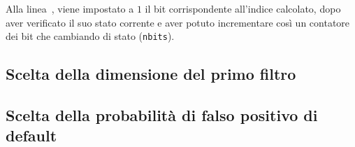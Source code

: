 Alla linea~\label{line:togglebit}, viene impostato a $1$ il bit corrispondente all'indice calcolato,
dopo aver verificato il suo stato corrente e aver potuto incrementare così un contatore dei bit che
cambiando di stato (\verb|nbits|).

\subsection{Scelta della dimensione del primo filtro}
\label{sec:patch:basesize}


\subsection{Scelta della probabilità di falso positivo di default}
\label{sec:patch:defaulterror}



